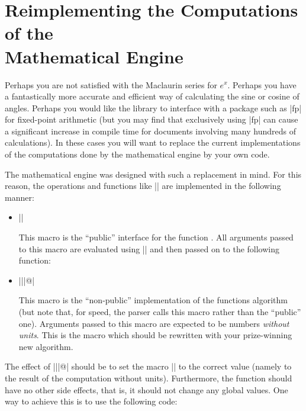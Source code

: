 %
%
%


\section[Reimplementing the Computations of the Mathematical Engine]
  {Reimplementing the Computations of the\\ Mathematical Engine}

\label{pgfmath-reimplement}

Perhaps you are not satisfied with the Maclaurin series for
$e^x$. Perhaps you have a fantastically more accurate
and efficient way of calculating the sine or cosine of angles. Perhaps
 you would like the library to interface with a package such as |fp| 
 for fixed-point arithmetic (but you may find that exclusively
 using |fp| can cause a significant increase in compile time for
 documents involving many hundreds of calculations).
In these cases you will want to replace the current implementations of
the computations done by the mathematical engine by your own code. 

The mathematical engine was designed with such a replacement in
mind. For this reason, the operations and functions like |\pgfmathadd|
are implemented in the following manner: 

\begin{itemize}
\item |\pgfmath| 

  This macro is the ``public'' interface for the function
  . All arguments passed to this macro are 
  evaluated using |\pgfmathparse| and then passed on to the following
  function:
  
\item |\pgfmath||@|
  
  This macro is the ``non-public'' implementation of the functions 
  algorithm (but note that, for speed, the parser calls this macro 
  rather than the ``public'' one). Arguments passed to this macro 
  are expected to be numbers \emph{without units}. This is the macro 
  which should be rewritten with your prize-winning new algorithm.
	
\end{itemize}

The effect of |\pgfmath||@| should be to set the
macro |\pgfmathresult| to the correct value (namely to the result of
the computation without units). Furthermore, the function should have
no other side effects, that is, it should not change any global
values. One way to achieve this is to use the following code:

